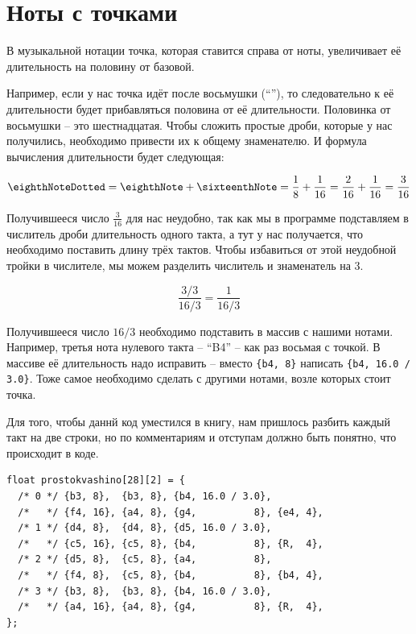 \documentclass[a4paper,twoside]{book}
\begin{document}
\section{Ноты с точками}

В музыкальной нотации точка, которая ставится справа от ноты, увеличивает её
длительность на половину от базовой.

Например, если у нас точка идёт после восьмушки (``\eighthNoteDotted''), то
следовательно к её длительности будет прибавляться половина от её длительности.
Половинка от восьмушки -- это шестнадцатая. Чтобы сложить простые дроби, которые
у нас получились, необходимо привести их к общему знаменателю. И формула
вычисления длительности будет следующая:

\begin{equation}
  \mbox{\eighthNoteDotted} = \mbox{\eighthNote} + \mbox{\sixteenthNote}
  = \frac{1}{8} + \frac{1}{16} = \frac{2}{16} + \frac{1}{16} = \frac{3}{16}
\end{equation}

Получившееся число $\frac{3}{16}$ для нас неудобно, так как мы в программе
подставляем в числитель дроби длительность одного такта, а тут у нас получается,
что необходимо поставить длину трёх тактов. Чтобы избавиться от этой неудобной
тройки в числителе, мы можем разделить числитель и знаменатель на 3.

\begin{equation}
  \frac{3 / 3}{16 / 3} = \frac{1}{16 / 3}
\end{equation}

Получившееся число $16 / 3$ необходимо подставить в массив с нашими нотами.
Например, третья нота нулевого такта -- ``B4'' -- как раз восьмая с точкой. В
массиве её длительность надо исправить -- вместо \texttt{\{b4, 8\}} написать
\texttt{\{b4, 16.0 / 3.0\}}. Тоже самое необходимо сделать с другими нотами,
возле которых стоит точка.

Для того, чтобы даннй код уместился в книгу, нам пришлось разбить каждый такт на
две строки, но по комментариям и отступам должно быть понятно, что происходит в
коде.

\begin{verbatim}
float prostokvashino[28][2] = {
  /* 0 */ {b3, 8},  {b3, 8}, {b4, 16.0 / 3.0},
  /*   */ {f4, 16}, {a4, 8}, {g4,          8}, {e4, 4},
  /* 1 */ {d4, 8},  {d4, 8}, {d5, 16.0 / 3.0},
  /*   */ {c5, 16}, {c5, 8}, {b4,          8}, {R,  4},
  /* 2 */ {d5, 8},  {c5, 8}, {a4,          8},
  /*   */ {f4, 8},  {c5, 8}, {b4,          8}, {b4, 4},
  /* 3 */ {b3, 8},  {b3, 8}, {b4, 16.0 / 3.0},
  /*   */ {a4, 16}, {a4, 8}, {g4,          8}, {R,  4},
};
\end{verbatim}
\end{document}
